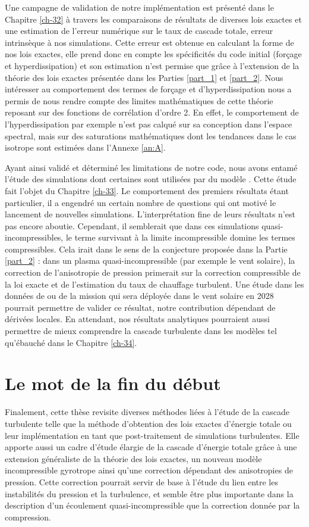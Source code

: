 Une campagne de validation de notre implémentation est présenté dans le Chapitre \ref{ch-32} à travers les comparaisons de résultats de diverses lois exactes et une estimation de l'erreur numérique sur le taux de cascade totale, erreur intrinsèque à nos simulations. Cette erreur est obtenue en calculant la forme  de nos lois exactes, elle prend donc en compte les spécificités du code initial (forçage et hyperdissipation) et son estimation n'est permise que grâce à l'extension de la théorie des lois exactes présentée dans les Parties \ref{part_1} et \ref{part_2}. Nous intéresser au comportement des termes de forçage et d'hyperdissipation nous a permis de nous rendre compte des limites mathématiques de cette théorie reposant sur des fonctions de corrélation d'ordre 2. En effet, le comportement de l'hyperdissipation par exemple n'est pas calqué sur sa conception dans l'espace spectral, mais sur des saturations mathématiques dont les tendances dans le cas isotrope sont estimées dans l'Annexe \ref{an:A}. 

Ayant ainsi validé et déterminé les limitations de notre code, nous avons entamé l'étude des simulations dont certaines sont utilisées par \cite{ferrand_fluid_2021} du modèle . Cette étude fait l'objet du Chapitre \ref{ch-33}. Le comportement des premiers résultats étant particulier, il a engendré un certain nombre de questions qui ont motivé le lancement de nouvelles simulations. L'interprétation fine de leurs résultats n'est pas encore aboutie. Cependant, il semblerait que dans ces simulations quasi-incompressibles, le terme survivant à la limite incompressible domine les termes compressibles. Cela irait dans le sens de la conjecture proposée dans la Partie \ref{part_2} : dans un plasma quasi-incompressible (par exemple le vent solaire), la correction de l'anisotropie de pression primerait sur la correction compressible de la loi exacte et de l'estimation du taux de chauffage turbulent. Une étude dans les données de  ou de la mission  qui sera déployée dans le vent solaire en 2028 pourrait permettre de valider ce résultat, notre contribution dépendant de dérivées locales. En attendant, nos résultats analytiques pourraient aussi permettre de mieux comprendre la cascade turbulente dans les modèles  tel qu'ébauché dans le Chapitre \ref{ch-34}.

\section{Le mot de la fin du début}
Finalement, cette thèse revisite diverses méthodes liées à l'étude de la cascade turbulente telle que la méthode d'obtention des lois exactes d'énergie totale ou leur implémentation en tant que post-traitement de simulations turbulentes. Elle apporte aussi un cadre d'étude élargie de la cascade d'énergie totale grâce à une extension généraliste de la théorie des lois exactes, un nouveau modèle incompressible gyrotrope ainsi qu'une correction dépendant des anisotropies de pression. Cette correction pourrait servir de base à l'étude du lien entre les instabilités du pression et la turbulence, et semble être plus importante dans la description d'un écoulement quasi-incompressible que la correction donnée par la compression. 

